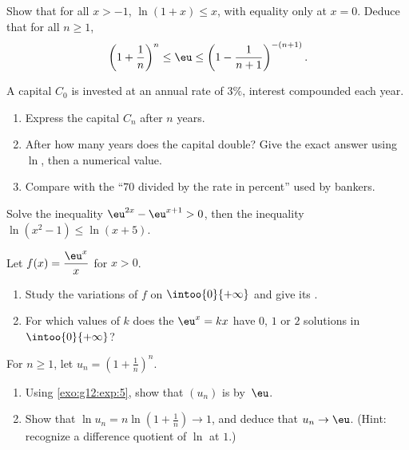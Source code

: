 \begin{exercise}[$\star\star$]\label{exo:g12:exp:5}
Show that for all $x > -1$, $\ln(1 + x) \leq x$, with equality only at
$x = 0$. Deduce that for all $n \geq 1$,
\[
\left(1 + \frac{1}{n}\right)^n \leq \eu \leq \left(1 - \frac{1}{n+1}\right)^{-(n+1)} .
\]
\end{exercise}

\begin{exercise}[$\star\star$]\label{exo:g12:exp:6}
A capital $C_0$ is invested at an annual rate of $3\%$, interest compounded
each year.
\begin{enumerate}
  \item Express the capital $C_n$ after $n$ years.
  \item After how many years does the capital double? Give the exact answer
        using $\ln$, then a numerical value.
  \item Compare with the  ``$70$ divided by the rate in
        percent'' used by bankers.
\end{enumerate}
\end{exercise}

\begin{exercise}[$\star\star$]\label{exo:g12:exp:7}
Solve the inequality $\eu^{2x} - \eu^{x+1} > 0$, then the inequality
$\ln(x^2 - 1) \leq \ln(x + 5)$.
\end{exercise}

\begin{exercise}[$\star\star\star$]\label{exo:g12:exp:8}
Let $f(x) = \dfrac{\eu^x}{x}$ for $x > 0$.
\begin{enumerate}
  \item Study the variations of $f$ on $\intoo{0}{+\infty}$ and give its
        .
  \item For which values of $k$ does the  $\eu^x = kx$ have $0$, $1$
        or $2$ solutions in $\intoo{0}{+\infty}$?
\end{enumerate}
\end{exercise}

\begin{exercise}[$\star\star\star$]\label{exo:g12:exp:9}
For $n \geq 1$, let $u_n = \left(1 + \frac1n\right)^n$.
\begin{enumerate}
  \item Using \cref{exo:g12:exp:5}, show that $(u_n)$ is 
        by~$\eu$.
  \item Show that $\ln u_n = n \ln\left(1 + \frac1n\right) \to 1$, and
        deduce that $u_n \to \eu$.
        (Hint: recognize a difference quotient of $\ln$ at $1$.)
\end{enumerate}
\end{exercise}

